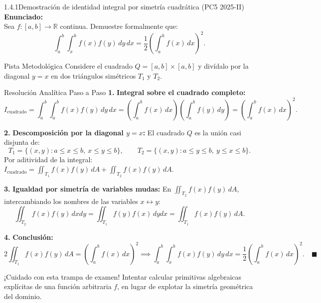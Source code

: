 \documentclass[11pt,a4paper]{article}
\begin{document}
\begin{nivelbox}{1.4.1}{Demostración de identidad integral por simetría cuadrática (PC5 2025-II)}
\textbf{Enunciado:}\\
Sea $f: [a,b] \to \mathbb{R}$ continua. Demuestre formalmente que:
\[\int_a^b \int_x^b f(x)f(y) \, dy \, dx = \frac{1}{2} \left( \int_a^b f(x) \, dx \right)^2.\]

\begin{observacionbox}{Pista Metodológica}
Considere el cuadrado $Q = [a,b] \times [a,b]$ y divídalo por la diagonal $y = x$ en dos triángulos simétricos $T_1$ y $T_2$.
\end{observacionbox}

\begin{ejerciciobox}{Resolución Analítica Paso a Paso}
\smallskip\noindent\textbf{1.} \textbf{Integral sobre el cuadrado completo:}
\[I_{\text{cuadrado}} = \int_a^b \int_a^b f(x)f(y) \, dy \, dx = \left( \int_a^b f(x) \, dx \right) \left( \int_a^b f(y) \, dy \right) = \left( \int_a^b f(x) \, dx \right)^2.\]

\smallskip\noindent\textbf{2.} \textbf{Descomposición por la diagonal $y = x$:}
El cuadrado $Q$ es la unión casi disjunta de:
\[T_1 = \{ (x,y) : a \le x \le b, \ x \le y \le b \}, \qquad T_2 = \{ (x,y) : a \le y \le b, \ y \le x \le b \}.\]
Por aditividad de la integral: $I_{\text{cuadrado}} = \iint_{T_1} f(x)f(y) \, dA + \iint_{T_2} f(x)f(y) \, dA$.

\smallskip\noindent\textbf{3.} \textbf{Igualdad por simetría de variables mudas:}
En $\iint_{T_2} f(x)f(y) \, dA$, intercambiando los nombres de las variables $x \leftrightarrow y$:
\[\iint_{T_2} f(x)f(y) \, dx dy = \iint_{T_1} f(y)f(x) \, dy dx = \iint_{T_1} f(x)f(y) \, dA.\]

\smallskip\noindent\textbf{4.} \textbf{Conclusión:}
\[2 \iint_{T_1} f(x)f(y) \, dA = \left( \int_a^b f(x) \, dx \right)^2 \implies \int_a^b \int_x^b f(x)f(y) \, dy \, dx = \frac{1}{2} \left( \int_a^b f(x) \, dx \right)^2. \quad \blacksquare\]
\end{ejerciciobox}

\begin{errorbox}{¡Cuidado con esta trampa de examen!}
Intentar calcular primitivas algebraicas explícitas de una función arbitraria $f$, en lugar de explotar la simetría geométrica del dominio.
\end{errorbox}
\end{nivelbox}
\bigskip
\end{document}
